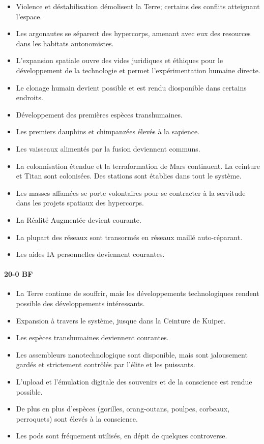 \begin{itemize} 
   \item Violence et déstabilisation démolisent la Terre; certains des conflits
      atteignant l'espace. 
   \item Les argonautes se séparent des hypercorps, amenant avec eux des
      resources dans les habitats autonomistes. 
   \item L'expansion spatiale ouvre des vides juridiques et éthiques pour le
      développement de la technologie et permet l'expérimentation humaine
      directe. 
   \item Le clonage humain devient possible et est rendu diosponible dans
      certains endroits. 
   \item Développement des premières espèces transhumaines. 
   \item Les premiers dauphins et chimpanzées élevés à la sapience. 
   \item Les vaisseaux alimentés par la fusion deviennent communs. 
   \item La colonnisation étendue et la terraformation de Mars continuent. La
      ceinture et Titan sont colonisées. Des stations sont établies dans tout
      le système. 
   \item Les masses affamées se porte volontaires pour se contracter à la
      servitude dans les projets spatiaux des hypercorps. 
   \item La Réalité Augmentée devient courante. 
   \item La plupart des réseaux sont transormés en réseaux maillé auto-réparant. 
   \item Les aides IA personnelles deviennent courantes.
\end{itemize} 

\paragraph{20-0 BF} 

\begin{itemize} 
   \item La Terre continue de souffrir, mais les développements technologiques
      rendent possible des développements intéressants. 
   \item Expansion à travers le système, jusque dans la Ceinture de Kuiper. 
   \item Les espèces transhumaines deviennent courantes. 
   \item Les assembleurs nanotechnologique sont disponible, mais sont
      jalousement gardés et strictement contrôlés par l'élite et les puissants. 
   \item L'upload et l'émulation digitale des souvenirs et de la conscience est
      rendue possible. 
   \item De plus en plus d'espèces (gorilles, orang-outans, poulpes, corbeaux,
      perroquets) sont élevés à la conscience. 
   \item Les pods sont fréquement utilisés, en dépit de quelques controverse.
\end{itemize} 

